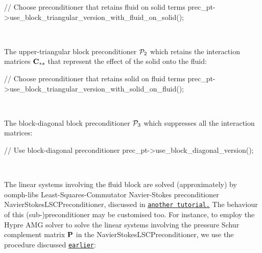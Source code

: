 \begin{DoxyEnumerate}
\begin{DoxyEnumerate}
\begin{DoxyCodeInclude}
        \textcolor{comment}{// Choose preconditioner that retains fluid on solid terms}
        prec\_pt->use\_block\_triangular\_version\_with\_fluid\_on\_solid();

\end{DoxyCodeInclude}
 ~\newline

\item The upper-\/triangular block preconditioner $ {\cal P}_2 $ which retains the interaction matrices $ {\bf C}_{*s} $ that represent the effect of the solid onto the fluid\+: ~\newline
~\newline
  
\begin{DoxyCodeInclude}
        \textcolor{comment}{// Choose preconditioner that retains solid on fluid terms}
        prec\_pt->use\_block\_triangular\_version\_with\_solid\_on\_fluid();

\end{DoxyCodeInclude}
 ~\newline

\item The block-\/diagonal block preconditioner $ {\cal P}_3 $ which suppresses all the interaction matrices\+: ~\newline
~\newline
  
\begin{DoxyCodeInclude}
        \textcolor{comment}{// Use block-diagonal preconditioner}
        prec\_pt->use\_block\_diagonal\_version();

\end{DoxyCodeInclude}
 ~\newline

\end{DoxyEnumerate}The linear systems involving the fluid block are solved (approximately) by {\ttfamily oomph-\/lib\textquotesingle{}s} Least-\/\+Squares-\/\+Commutator Navier-\/\+Stokes preconditioner {\ttfamily Navier\+Stokes\+L\+S\+C\+Preconditioner}, discussed in \href{../../lsc_navier_stokes/html/index.html}{\tt another tutorial.} The behaviour of this (sub-\/)preconditioner may be customised too. For instance, to employ the {\ttfamily Hypre} A\+MG solver to solve the linear systems involving the pressure Schur complement matrix $ {\bf P} $ in the {\ttfamily Navier\+Stokes\+L\+S\+C\+Preconditioner}, we use the procedure discussed \href{../../lsc_navier_stokes/html/index.html}{\tt earlier}\+: ~\newline
~\newline
  

\end{DoxyEnumerate}
